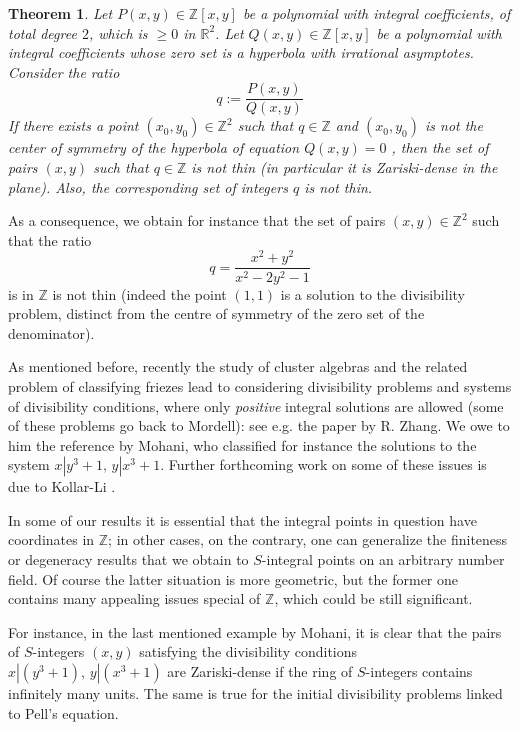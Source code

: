\documentclass[leqno,12pt]{article} %
\def\Z{{{\mathbb Z}}}
\def\R{{{\mathbb R}}}
\theoremstyle{plain} %
\newtheorem{theorem}{\indent\sc Theorem}[section]
\theoremstyle{definition} %
\begin{document}
\begin{theorem}\label{T.divisibility}
Let $P(x,y)\in\Z[x,y]$ be a polynomial with integral coefficients, of total degree $2$, which is $\geq 0$ in $\R^2$. Let $Q(x,y)\in \Z[x,y]$ be a polynomial with integral coefficients whose zero set is a hyperbola with irrational asymptotes. Consider the ratio
$$
q:=\frac{P(x,y)}{Q(x,y)}
$$
If there exists a point $(x_0,y_0)\in \Z^2$ such that $q\in \Z$ and $(x_0,y_0)$ is not the center of symmetry of the   hyperbola  of equation $Q(x,y)=0$ , then the set of  pairs $(x,y) $ such that $q\in\Z$ is not thin (in particular it is Zariski-dense in the plane). Also, the corresponding set of integers $q$ is not thin.
\end{theorem}  

\smallskip

As a consequence, we obtain  for instance that the set of  pairs $(x,y)\in\Z^2$ such that the ratio  
$$
q=\frac{x^2+y^2}{x^2-2y^2-1}
$$
is in $\Z$    is  not thin (indeed the point $(1,1)$ is a solution to the divisibility problem, distinct from the centre of symmetry of the zero set of the denominator). 
  
  \smallskip
  
  
 As mentioned before, recently the study of cluster algebras and the related problem of classifying friezes  lead to considering divisibility problems and systems of divisibility conditions, where only {\it positive} integral solutions are allowed (some of these problems go back to {\sc Mordell}): see e.g. the paper \cite{Zh} by {\sc R. Zhang}. We owe to him the reference \cite{Moh} 
  by {\sc Mohani}, who classified for instance  the solutions to the system $x|y^3+1,\, y|x^3+1$.  Further forthcoming work on some of these issues is due to {\sc Kollar-Li} \cite{KL}.

 
 \medskip

In some of our results it is essential that the integral points in question have  coordinates in $\Z$; in other cases, on the contrary, one can generalize the finiteness or degeneracy results that we obtain to $S$-integral points   on an arbitrary number field. Of course the latter situation is more geometric, but the former one contains many appealing issues special of $\Z$, which could be still significant. 

For instance, in the last mentioned example by {\sc Mohani}, it is clear that the pairs of $S$-integers $(x,y)$ satisfying the divisibility conditions $x|(y^3+1),\, y|(x^3+1)$ are Zariski-dense if the ring of $S$-integers contains infinitely many units. The same is true for the initial divisibility problems linked to Pell's equation.
\end{document}
